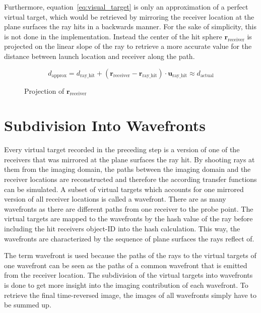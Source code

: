 Furthermore, equation~\eqref{eq:visual_target} is only an approximation of a perfect virtual target, which would be retrieved by mirroring the receiver location at the plane surfaces the ray hits in a backwards manner.
For the sake of simplicity, this is not done in the implementation.
Instead the center of the hit sphere \(\bm{r}_{\text{receiver}}\) is projected on the linear slope of the ray to retrieve a more accurate value for the distance between launch location and receiver along the path.

\begin{equation}
    d_{\text{approx}} = d_{\text{ray\_hit}} +  (\bm{r}_{\text{receiver}} - \bm{r}_{\text{ray\_hit}}) \cdot \bm{u}_{\text{ray\_hit}} \approx d_{\text{actual}}
\end{equation}

\begin{figure}[h]
    \centering
    \def\svgwidth{0.5\textwidth}
    
    \caption{Projection of \(\bm{r}_{\text{receiver}}\)}\label{fig:d_approx}
\end{figure}
 

\section{Subdivision Into Wavefronts}\label{section:subdivision_into_wavefronts}
Every virtual target recorded in the preceding step is a version of one of the receivers that was mirrored at the plane surfaces the ray hit.
By shooting rays at them from the imaging domain, the paths between the imaging domain and the receiver locations are reconstructed and therefore the according transfer functions can be simulated.
A subset of virtual targets which accounts for one mirrored version of all receiver locations is called a wavefront.
There are as many wavefronts as there are different paths from one receiver to the probe point.
The virtual targets are mapped to the wavefronts by the hash value of the ray before including the hit receivers object-ID into the hash calculation.
This way, the wavefronts are characterized by the sequence of plane surfaces the rays reflect of.

The term wavefront is used because the paths of the rays to the virtual targets of one wavefront can be seen as the paths of a common wavefront that is emitted from the receiver location.
The subdivision of the virtual targets into wavefronts is done to get more insight into the imaging contribution of each wavefront.
To retrieve the final time-reversed image, the images of all wavefronts simply have to be summed up.


